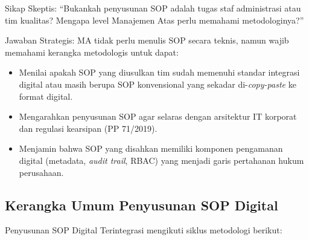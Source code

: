 \documentclass[12pt,a4paper]{report}
\begin{document}
\begin{plnbox}
\small
Sikap Skeptis: ``Bukankah penyusunan SOP adalah tugas staf administrasi atau tim kualitas? Mengapa level Manajemen Atas perlu memahami metodologinya?''

Jawaban Strategis: MA tidak perlu menulis SOP secara teknis, namun wajib memahami kerangka metodologis untuk dapat:
\begin{itemize}[nosep, leftmargin=*]
\item Menilai apakah SOP yang diusulkan tim sudah memenuhi standar integrasi digital atau masih berupa SOP konvensional yang sekadar di-\textit{copy-paste} ke format digital.
\item Mengarahkan penyusunan SOP agar selaras dengan arsitektur IT korporat dan regulasi kearsipan (PP 71/2019).
\item Menjamin bahwa SOP yang disahkan memiliki komponen pengamanan digital (metadata, \textit{audit trail}, RBAC) yang menjadi garis pertahanan hukum perusahaan.
\end{itemize}
\end{plnbox}

\subsection{Kerangka Umum Penyusunan SOP Digital}

Penyusunan SOP Digital Terintegrasi mengikuti siklus metodologi berikut:
\end{document}
